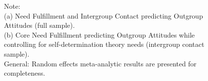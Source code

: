 \documentclass[man, 12pt, a4paper, mask]{apa7}
\theoremstyle{break}
\theoremstyle{plain}
\begin{document}
\begin{figure}
  \caption*{Note: \\
  (a) Need Fulfillment and Intergroup Contact predicting Outgroup Attitudes (full sample).\\
  (b) Core Need Fulfillment predicting Outgroup Attitudes while controlling for self-determination theory needs (intergroup contact sample).\\
  General: Random effects meta-analytic results are presented for completeness.}
\end{figure}
\end{document}
